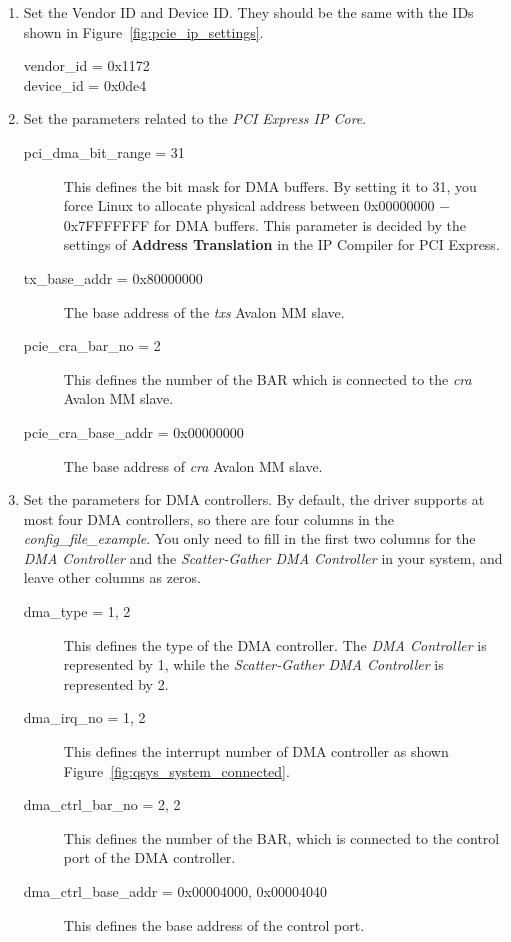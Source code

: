 \documentclass[11pt, twoside, pdftex]{article}
\begin{document}
\begin{enumerate}
	\item Set the Vendor ID and Device ID. They should be the same with the IDs shown in Figure~\ref{fig:pcie_ip_settings}.   
		\begin{description}
			\item[vendor\_id = 0x1172]
			\item[device\_id = 0x0de4] 
		\end{description}
	\item Set the parameters related to the {\it PCI Express IP Core}.  
		\begin{description}
			\item[pci\_dma\_bit\_range = 31] This defines the bit mask for DMA buffers. By setting it to 31, you force Linux to allocate physical address between 0x00000000 $-$ 0x7FFFFFFF for DMA buffers. This parameter is decided by the settings of {\bf Address Translation} in the IP Compiler for PCI Express.  
			\item[tx\_base\_addr = 0x80000000] The base address of the {\it txs} Avalon MM slave.
			\item[pcie\_cra\_bar\_no = 2] This defines the number of the BAR which is connected to the {\it cra} Avalon MM slave.
			\item[pcie\_cra\_base\_addr = 0x00000000] The base address of {\it cra} Avalon MM slave.
		\end{description}
	\item Set the parameters for DMA controllers. By default, the driver supports at most four DMA controllers, so there are four columns in the {\it config\_file\_example}. You only need to fill in the first two columns for the {\it DMA Controller} and the {\it Scatter-Gather DMA Controller} in your system, and leave other columns as zeros. 
		\begin{description}
			\item[dma\_type = 1, 2] This defines the type of the DMA controller. The {\it DMA Controller} is represented by 1, while the {\it Scatter-Gather DMA Controller} is represented by 2.
			\item[dma\_irq\_no = 1, 2] This defines the interrupt number of DMA controller as shown Figure~\ref{fig:qsys_system_connected}. 
			\item[dma\_ctrl\_bar\_no = 2, 2] This defines the number of the BAR, which is connected to the control port of the DMA controller. 
			\item[dma\_ctrl\_base\_addr = 0x00004000, 0x00004040] This defines the base address of the control port.

\end{description}
\end{enumerate}
\end{document}
